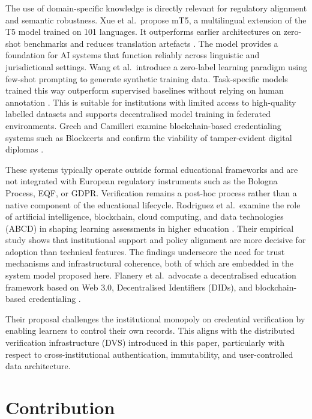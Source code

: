 \documentclass[oneside,10pt]{swissi}
\begin{document}
The use of domain-specific knowledge is directly relevant for regulatory alignment and semantic robustness. Xue et al.\ propose mT5, a multilingual extension of the T5 model trained on 101 languages. It outperforms earlier architectures on zero-shot benchmarks and reduces translation artefacts \cite{xue2020mt5}. The model provides a foundation for AI systems that function reliably across linguistic and jurisdictional settings. Wang et al.\ introduce a zero-label learning paradigm using few-shot prompting to generate synthetic training data. Task-specific models trained this way outperform supervised baselines without relying on human annotation \cite{wang2021zerolabel}. This is suitable for institutions with limited access to high-quality labelled datasets and supports decentralised model training in federated environments. Grech and Camilleri examine blockchain-based credentialing systems such as Blockcerts and confirm the viability of tamper-evident digital diplomas \cite{grech2017blockcerts}.

These systems typically operate outside formal educational frameworks and are not integrated with European regulatory instruments such as the Bologna Process, EQF, or GDPR. Verification remains a post-hoc process rather than a native component of the educational lifecycle. Rodriguez et al.\ examine the role of artificial intelligence, blockchain, cloud computing, and data technologies (ABCD) in shaping learning assessments in higher education \cite{rodriguez2025abcd}. Their empirical study shows that institutional support and policy alignment are more decisive for adoption than technical features. The findings underscore the need for trust mechanisms and infrastructural coherence, both of which are embedded in the system model proposed here. Flanery et al.\ advocate a decentralised education framework based on Web 3.0, Decentralised Identifiers (DIDs), and blockchain-based credentialing \cite{flanery2023web3edu}.

Their proposal challenges the institutional monopoly on credential verification by enabling learners to control their own records. This aligns with the distributed verification infrastructure (DVS) introduced in this paper, particularly with respect to cross-institutional authentication, immutability, and user-controlled data architecture.

\section{Contribution}
\end{document}
